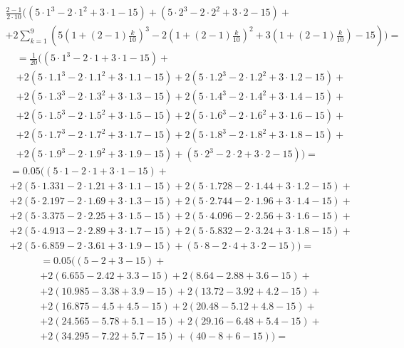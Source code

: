 \documentclass[10pt,a4paper]{article}
\begin{document}
    \begin{gather*}
        \frac{2-1}{2\cdot 10} ((5\cdot 1^3-2\cdot 1^2+3\cdot 1-15)+(5\cdot 2^3-2\cdot 2^2+3\cdot 2-15)+\\
            +2\sum_{k=1}^{9} \left(5\left(1+(2-1)\frac{k}{10}\right)^3
            -2\left(1+(2-1)\frac{k}{10}\right)^2
            +3\left(1+(2-1)\frac{k}{10}\right)
            -15\right))=
    \end{gather*}
    \begin{gather*}
        =\frac{1}{20}(\left(5\cdot 1^3-2\cdot 1+3\cdot 1-15\right)+\\
        +2\left(5\cdot 1.1^3-2\cdot 1.1^2+3\cdot 1.1-15\right)+2\left(5\cdot 1.2^3-2\cdot 1.2^2+3\cdot 1.2-15\right)+\\
        +2\left(5\cdot 1.3^3-2\cdot 1.3^2+3\cdot 1.3-15\right)+2\left(5\cdot 1.4^3-2\cdot 1.4^2+3\cdot 1.4-15\right)+\\
        +2\left(5\cdot 1.5^3-2\cdot 1.5^2+3\cdot 1.5-15\right)+2\left(5\cdot 1.6^3-2\cdot 1.6^2+3\cdot 1.6-15\right)+\\
        +2\left(5\cdot 1.7^3-2\cdot 1.7^2+3\cdot 1.7-15\right)+2\left(5\cdot 1.8^3-2\cdot 1.8^2+3\cdot 1.8-15\right)+\\
        +2\left(5\cdot 1.9^3-2\cdot 1.9^2+3\cdot 1.9-15\right)+\left(5\cdot 2^3-2\cdot 2+3\cdot 2-15\right))=
    \end{gather*}
    \begin{gather*}
        =0.05(\left(5\cdot 1-2\cdot 1+3\cdot 1-15\right)+\\
        +2\left(5\cdot 1.331-2\cdot 1.21+3\cdot 1.1-15\right)+2\left(5\cdot 1.728-2\cdot 1.44+3\cdot 1.2-15\right)+\\
        +2\left(5\cdot 2.197-2\cdot 1.69+3\cdot 1.3-15\right)+2\left(5\cdot 2.744-2\cdot 1.96+3\cdot 1.4-15\right)+\\
        +2\left(5\cdot 3.375-2\cdot 2.25+3\cdot 1.5-15\right)+2\left(5\cdot 4.096-2\cdot 2.56+3\cdot 1.6-15\right)+\\
        +2\left(5\cdot 4.913-2\cdot 2.89+3\cdot 1.7-15\right)+2\left(5\cdot 5.832-2\cdot 3.24+3\cdot 1.8-15\right)+\\
        +2\left(5\cdot 6.859-2\cdot 3.61+3\cdot 1.9-15\right)+\left(5\cdot 8-2\cdot 4+3\cdot 2-15\right))=
    \end{gather*}
    \begin{gather*}
        =0.05(\left(5-2+3-15\right)+\\
        +2\left(6.655-2.42+3.3-15\right)+2\left(8.64-2.88+3.6-15\right)+\\
        +2\left(10.985-3.38+3.9-15\right)+2\left(13.72-3.92+4.2-15\right)+\\
        +2\left(16.875-4.5+4.5-15\right)+2\left(20.48-5.12+4.8-15\right)+\\
        +2\left(24.565-5.78+5.1-15\right)+2\left(29.16-6.48+5.4-15\right)+\\
        +2\left(34.295-7.22+5.7-15\right)+\left(40-8+6-15\right))=
    \end{gather*}
\end{document}
